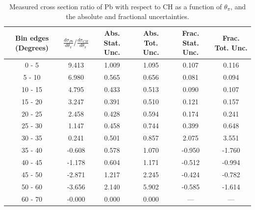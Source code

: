\documentclass[aps,prl,twocolumn,superscriptaddress,nofootinbib]{revtex4-1}
\begin{document}
\begin{table}[h!]
  \centering
  \caption{Measured cross section ratio of Pb with respect to CH as a function
  of $\theta_{\pi}$,  and the absolute and fractional uncertainties.}
    \begin{tabular}{c||c||c|c||c|c}
      Bin edges (Degrees) & $\frac{d\sigma_{Pb}}{d\theta_{\pi}}/\frac{d\sigma_{CH}}{d\theta_{\pi}}$ & Abs. Stat. Unc. & Abs. Tot. Unc. & Frac. Stat. Unc. & Frac. Tot. Unc. \\
      \hline\hline
        0 - 5 & 9.413 & 1.009 & 1.095 & 0.107 & 0.116 \\
       5 - 10 & 6.980 & 0.565 & 0.656 & 0.081 & 0.094 \\
      10 - 15 & 4.795 & 0.433 & 0.513 & 0.090 & 0.107 \\
      15 - 20 & 3.247 & 0.391 & 0.510 & 0.121 & 0.157 \\
      20 - 25 & 2.458 & 0.428 & 0.594 & 0.174 & 0.241 \\
      25 - 30 & 1.147 & 0.458 & 0.744 & 0.399 & 0.648 \\
      30 - 35 & 0.241 & 0.501 & 0.857 & 2.075 & 3.551 \\
      35 - 40 & -0.608 & 0.578 & 1.070 & -0.950 & -1.760 \\
      40 - 45 & -1.178 & 0.604 & 1.171 & -0.512 & -0.994 \\
      45 - 50 & -2.871 & 1.217 & 2.245 & -0.424 & -0.782 \\
      50 - 60 & -3.656 & 2.140 & 5.902 & -0.585 & -1.614 \\
      60 - 70 & -0.000 & 0.000 & 0.000 & --- & --- \\
    \end{tabular}
  \label{table:ThetaPiXSecRatio_Pb}
\end{table}
\clearpage
\end{document}

